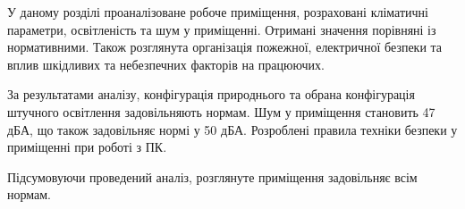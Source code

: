     У даному розділі проаналізоване робоче приміщення, розраховані кліматичні параметри, освітленість та шум у приміщенні. Отримані значення порівняні із нормативними. Також розглянута організація пожежної, електричної безпеки та вплив шкідливих та небезпечних факторів на працюючих.

    За результатами аналізу, конфігурація природнього та обрана конфігурація штучного освітлення задовільняють нормам.
    Шум у приміщення становить 47 дБА, що також задовільняє нормі у 50 дБА.
    Розроблені правила техніки безпеки у приміщенні при роботі з ПК.

    Підсумовуючи проведений аналіз, розглянуте приміщення задовільняє всім нормам.
